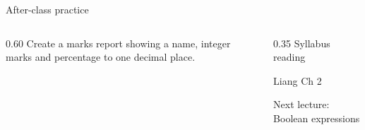 \documentclass[10pt,aspectratio=169]{beamer}
\begin{document}
\begin{frame}[fragile,t]{After-class practice}
\begin{columns}[T,onlytextwidth]\begin{column}{0.60\textwidth}
Create a marks report showing a name, integer marks and percentage to one decimal place.
\end{column}\begin{column}{0.35\textwidth}\small
Syllabus reading\par Liang Ch 2

Next lecture: Boolean expressions
\end{column}\end{columns}
\end{frame}
\end{document}
